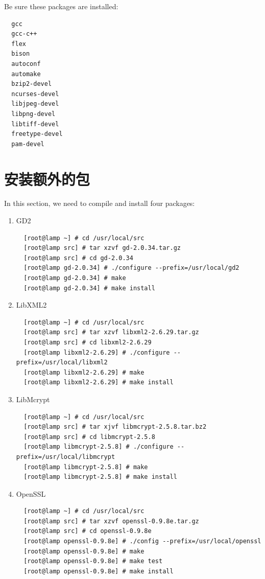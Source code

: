 Be sure these packages are installed:

\small{
\begin{verbatim}
  gcc
  gcc-c++
  flex
  bison
  autoconf
  automake
  bzip2-devel
  ncurses-devel
  libjpeg-devel
  libpng-devel
  libtiff-devel
  freetype-devel
  pam-devel
\end{verbatim}
}
\normalsize

\section{安装额外的包}

In this section, we need to compile and install four packages:

\begin{enumerate}[itemsep=0pt,parsep=0pt]
\item GD2
  \small{
\begin{verbatim}
  [root@lamp ~] # cd /usr/local/src
  [root@lamp src] # tar xzvf gd-2.0.34.tar.gz
  [root@lamp src] # cd gd-2.0.34
  [root@lamp gd-2.0.34] # ./configure --prefix=/usr/local/gd2
  [root@lamp gd-2.0.34] # make
  [root@lamp gd-2.0.34] # make install  
\end{verbatim}
  }
  \normalsize

\item LibXML2
  \small{
\begin{verbatim}
  [root@lamp ~] # cd /usr/local/src
  [root@lamp src] # tar xzvf libxml2-2.6.29.tar.gz
  [root@lamp src] # cd libxml2-2.6.29
  [root@lamp libxml2-2.6.29] # ./configure --prefix=/usr/local/libxml2
  [root@lamp libxml2-2.6.29] # make
  [root@lamp libxml2-2.6.29] # make install
\end{verbatim}
  }
  \normalsize

\item LibMcrypt
  \small{
\begin{verbatim}
  [root@lamp ~] # cd /usr/local/src
  [root@lamp src] # tar xjvf libmcrypt-2.5.8.tar.bz2
  [root@lamp src] # cd libmcrypt-2.5.8
  [root@lamp libmcrypt-2.5.8] # ./configure --prefix=/usr/local/libmcrypt
  [root@lamp libmcrypt-2.5.8] # make
  [root@lamp libmcrypt-2.5.8] # make install
\end{verbatim}
  }
  \normalsize

\item OpenSSL
  \small{
\begin{verbatim}
  [root@lamp ~] # cd /usr/local/src
  [root@lamp src] # tar xzvf openssl-0.9.8e.tar.gz
  [root@lamp src] # cd openssl-0.9.8e
  [root@lamp openssl-0.9.8e] # ./config --prefix=/usr/local/openssl
  [root@lamp openssl-0.9.8e] # make
  [root@lamp openssl-0.9.8e] # make test
  [root@lamp openssl-0.9.8e] # make install
\end{verbatim}
  }
  \normalsize

\end{enumerate}

